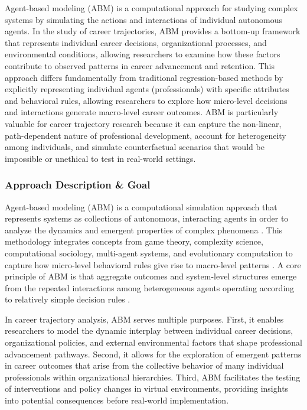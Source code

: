 \documentclass[main.tex]{subfiles}
\begin{document}
Agent-based modeling (ABM) is a computational approach for studying complex systems by simulating the actions and interactions of individual autonomous agents. In the study of career trajectories, ABM provides a bottom-up framework that represents individual career decisions, organizational processes, and environmental conditions, allowing researchers to examine how these factors contribute to observed patterns in career advancement and retention. This approach differs fundamentally from traditional regression-based methods by explicitly representing individual agents (professionals) with specific attributes and behavioral rules, allowing researchers to explore how micro-level decisions and interactions generate macro-level career outcomes. ABM is particularly valuable for career trajectory research because it can capture the non-linear, path-dependent nature of professional development, account for heterogeneity among individuals, and simulate counterfactual scenarios that would be impossible or unethical to test in real-world settings\parencite{columbia_abm}.

\subsubsection{Approach Description \& Goal}

Agent-based modeling (ABM) is a computational simulation approach that represents systems as collections of autonomous, interacting agents in order to analyze the dynamics and emergent properties of complex phenomena \parencite{bonabeau2002,epstein1996}. This methodology integrates concepts from game theory, complexity science, computational sociology, multi-agent systems, and evolutionary computation to capture how micro-level behavioral rules give rise to macro-level patterns \parencite{axelrod1997,tesfatsion2002}. A core principle of ABM is that aggregate outcomes and system-level structures emerge from the repeated interactions among heterogeneous agents operating according to relatively simple decision rules \parencite{macy2002,miller2007}.


In career trajectory analysis, ABM serves multiple purposes. First, it enables researchers to model the dynamic interplay between individual career decisions, organizational policies, and external environmental factors that shape professional advancement pathways. Second, it allows for the exploration of emergent patterns in career outcomes that arise from the collective behavior of many individual professionals within organizational hierarchies. Third, ABM facilitates the testing of interventions and policy changes in virtual environments, providing insights into potential consequences before real-world implementation\parencite{columbia_abm,fourweekmba}.
\end{document}
